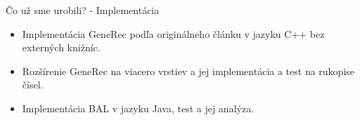 \documentclass[xcolor=dvipsnames]{beamer}
\begin{document}


\begin{frame}{Čo už sme urobili? - Implementácia}
  \begin{itemize}
    \item Implementácia GeneRec podľa originálneho článku v jazyku C++ bez externých knižníc. 
    \item Rozšírenie GeneRec na viacero vrstiev a jej implementácia a test na rukopise čísel. 
  \end{itemize}

  \begin{itemize}
    \item Implementácia BAL v jazyku Java, test a jej analýza. 
  \end{itemize}
\end{frame}
\end{document}
